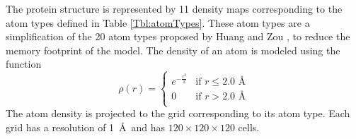 The protein structure is represented by 11 density maps corresponding
to the atom types defined in Table \ref{Tbl:atomTypes}. These atom
types are a simplification of the 20 atom types proposed by Huang and
Zou \cite{huang2006iterative, huang2008iterative}, to reduce the
memory footprint of the model.
%
%
The density of an atom is modeled using the function
\begin{equation}
\label{eq:rho}
\rho(r) =  \begin{cases}
               e^{-\frac{r^2}{2}}&\text{if } r\leq 2.0\text{ \AA} \\
               0                 &\text{if } r>2.0\text{ \AA} \\
            \end{cases}
\end{equation}
The atom density is projected to the grid corresponding to its atom
type. Each grid has a resolution of 1~\AA\ and has $120\times
120\times 120$ cells.


